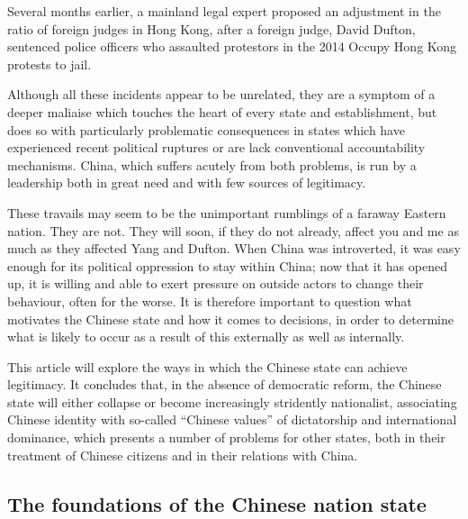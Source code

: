 \documentclass[11pt,a4paper]{report}
\newcounter{count}
\begin{document}
\begin{multicols}{2}
Several months earlier, a mainland legal expert proposed an adjustment in the ratio of foreign judges in Hong Kong, after a foreign judge, David Dufton, sentenced police officers who assaulted protestors in the 2014 Occupy Hong Kong protests to jail.

Although all these incidents appear to be unrelated, they are a symptom of a deeper maliaise which touches the heart of every state and establishment, but does so with particularly problematic consequences in states which have experienced recent political ruptures or are lack conventional accountability mechanisms. China, which suffers acutely from both problems, is run by a leadership both in great need and with few sources of legitimacy.

These travails may seem to be the unimportant rumblings of a faraway Eastern nation. They are not. They will soon, if they do not already, affect you and me as much as they affected Yang and Dufton. When China was introverted, it was easy enough for its political oppression to stay within China; now that it has opened up, it is willing and able to exert pressure on outside actors to change their behaviour, often for the worse. It is therefore important to question what motivates the Chinese state and how it comes to decisions, in order to determine what is likely to occur as a result of this externally as well as internally.

This article will explore the ways in which the Chinese state can achieve legitimacy. It concludes that, in the absence of democratic reform, the Chinese state will either collapse or become increasingly stridently nationalist, associating Chinese identity with so-called ``Chinese values'' of dictatorship and international dominance, which presents a number of problems for other states, both in their treatment of Chinese citizens and in their relations with China.

\end{multicols}

\subsection{The foundations of the Chinese nation state}
\end{document}
